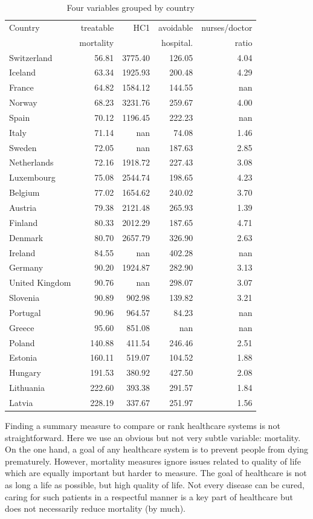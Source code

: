\documentclass{article}
\begin{document}
\begin{table}[htbp]
\caption{\label{tab:orgd6eb02a}Four variables grouped by country}
\centering
\begin{tabular}{lrrrr}
Country & treatable & HC1 & avoidable & nurses/doctor\\
 & mortality &  & hospital. & ratio\\
\hline
Switzerland & 56.81 & 3775.40 & 126.05 & 4.04\\
Iceland & 63.34 & 1925.93 & 200.48 & 4.29\\
France & 64.82 & 1584.12 & 144.55 & nan\\
Norway & 68.23 & 3231.76 & 259.67 & 4.00\\
Spain & 70.12 & 1196.45 & 222.23 & nan\\
Italy & 71.14 & nan & 74.08 & 1.46\\
Sweden & 72.05 & nan & 187.63 & 2.85\\
Netherlands & 72.16 & 1918.72 & 227.43 & 3.08\\
Luxembourg & 75.08 & 2544.74 & 198.65 & 4.23\\
Belgium & 77.02 & 1654.62 & 240.02 & 3.70\\
Austria & 79.38 & 2121.48 & 265.93 & 1.39\\
Finland & 80.33 & 2012.29 & 187.65 & 4.71\\
Denmark & 80.70 & 2657.79 & 326.90 & 2.63\\
Ireland & 84.55 & nan & 402.28 & nan\\
Germany & 90.20 & 1924.87 & 282.90 & 3.13\\
United Kingdom & 90.76 & nan & 298.07 & 3.07\\
Slovenia & 90.89 & 902.98 & 139.82 & 3.21\\
Portugal & 90.96 & 964.57 & 84.23 & nan\\
Greece & 95.60 & 851.08 & nan & nan\\
Poland & 140.88 & 411.54 & 246.46 & 2.51\\
Estonia & 160.11 & 519.07 & 104.52 & 1.88\\
Hungary & 191.53 & 380.92 & 427.50 & 2.08\\
Lithuania & 222.60 & 393.38 & 291.57 & 1.84\\
Latvia & 228.19 & 337.67 & 251.97 & 1.56\\
\end{tabular}
\end{table}

Finding a summary measure to compare or rank healthcare systems is not straightforward. Here we use an obvious but not very subtle variable: mortality. On the one hand, a goal of any healthcare system is to prevent people from dying prematurely. However, mortality measures ignore issues related to quality of life which are equally important but harder to measure. The goal of healthcare is not as long a life as possible, but high quality of life. Not every disease can be cured, caring for such patients in a respectful manner is a key part of healthcare but does not necessarily reduce mortality (by much).
\end{document}
